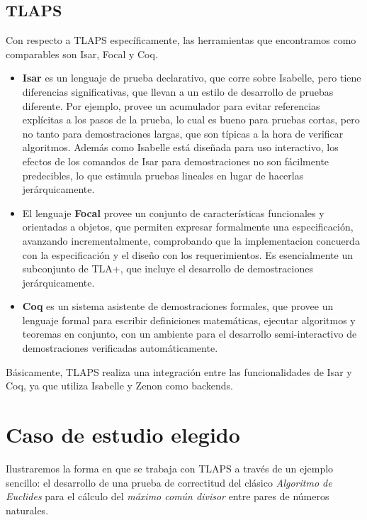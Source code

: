 \documentclass[spanish]{llncs}
\begin{document}
  \subsection{TLAPS}
  Con respecto a TLAPS específicamente, las herramientas que encontramos como comparables son Isar, Focal y Coq.
    \begin{itemize}
      \item 
      \textbf{Isar} es un lenguaje de prueba declarativo, que corre sobre Isabelle, pero tiene diferencias significativas, que llevan a un estilo de desarrollo de pruebas diferente. Por ejemplo, provee un acumulador para evitar referencias explícitas a los pasos de la prueba, lo cual es bueno para pruebas cortas, pero no tanto para demostraciones largas, que son típicas a la hora de verificar algoritmos. Además como Isabelle está diseñada para uso interactivo, los efectos de los comandos de Isar para demostraciones no son fácilmente 
      predecibles, lo que estimula pruebas lineales en lugar de hacerlas jerárquicamente. 

      \item
      El lenguaje \textbf{Focal} provee un conjunto de características funcionales y orientadas a objetos, que permiten expresar formalmente una especificación, avanzando incrementalmente, comprobando que la implementacion concuerda con la especificación y el diseño con los requerimientos. Es esencialmente un subconjunto de TLA+, que incluye el desarrollo 
      de demostraciones jerárquicamente.

      \item
      \textbf{Coq} es un sistema asistente de demostraciones formales, que provee un lenguaje formal para escribir definiciones matemáticas, ejecutar algoritmos y teoremas en conjunto, con un ambiente para el desarrollo semi-interactivo de demostraciones verificadas automáticamente.

    \end{itemize}
  
  Básicamente, TLAPS realiza una integración entre las funcionalidades de  Isar y Coq, ya que utiliza Isabelle y Zenon como backends.

\section{Caso de estudio elegido}


Ilustraremos la forma en que se trabaja con TLAPS a través de un ejemplo sencillo\cite{example}: 
el desarrollo de una prueba de correctitud del clásico \textit{Algoritmo de Euclides} para el cálculo del \textit{máximo común divisor} entre pares de números naturales.
\end{document}
